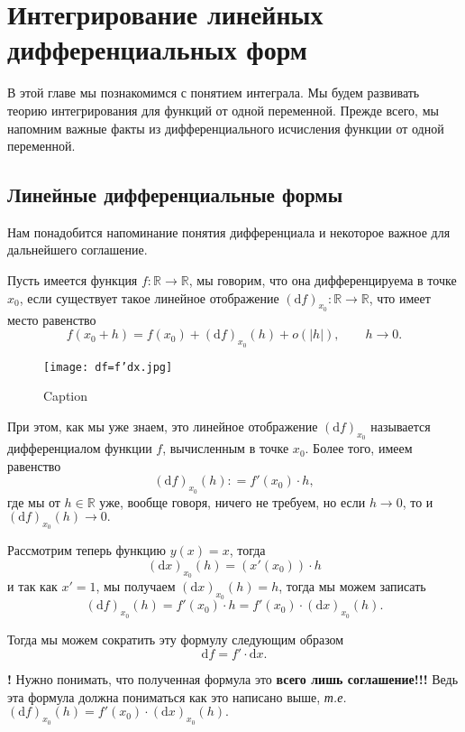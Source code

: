 \chapter{Интегрирование линейных дифференциальных форм}

В этой главе мы познакомимся с понятием интеграла. Мы будем развивать теорию интегрирования для функций от одной переменной. Прежде всего, мы напомним важные факты из дифференциального исчисления функции от одной переменной.

\section{Линейные дифференциальные формы}

Нам понадобится напоминание понятия дифференциала и некоторое важное для дальнейшего соглашение.

Пусть имеется функция $f:\mathbb{R} \to \mathbb{R}$, мы говорим, что она дифференцируема в точке $x_0$, если существует такое линейное отображение $(\mathrm{d}f)_{x_0}: \mathbb{R} \to \mathbb{R}$, что имеет место равенство
\[
 f(x_0 + h) = f(x_0) + (\mathrm{d}f)_{x_0}(h) + o(|h|), \qquad h \to 0.
\]

\begin{figure}[h!]
    \centering
    \texttt{[image: df=f'dx.jpg]}
    \caption{Caption}
    \label{fig:enter-label}
\end{figure}

При этом, как мы уже знаем, это линейное отображение $(\mathrm{d}f)_{x_0}$ называется дифференциалом функции $f$, вычисленным в точке $x_0$. Более того, имеем равенство
\[
 (\mathrm{d}f)_{x_0}(h): = f'(x_0)\cdot h, 
\]
где мы от $h \in \mathbb{R}$ уже, вообще говоря, ничего не требуем, но если $h\to 0$, то и $(\mathrm{d}f)_{x_0}(h) \to 0.$

Рассмотрим теперь функцию $y(x) = x$, тогда 
\[
 (\mathrm{d}x)_{x_0}(h) = (x'(x_0))\cdot h
\]
и так как $x' = 1$, мы получаем $(\mathrm{d}x)_{x_0}(h) = h$, тогда мы можем записать
\[
 (\mathrm{d}f)_{x_0}(h) = f'(x_0) \cdot h = f'(x_0) \cdot  (\mathrm{d}x)_{x_0}(h).
\]

Тогда мы можем сократить эту формулу следующим образом
\begin{equation}\label{df=f'dx}
  \boxed{
  \mathrm{d}f = f'\cdot \mathrm{d}x.
 }    
\end{equation}


\begin{mydanger}{\bf{!}}
    Нужно понимать, что полученная формула это \textbf{всего лишь соглашение!!!} Ведь эта формула должна пониматься как это написано выше, \textit{т.е.} $(\mathrm{d}f)_{x_0}(h) = f'(x_0) \cdot  (\mathrm{d}x)_{x_0}(h).$    
\end{mydanger}


